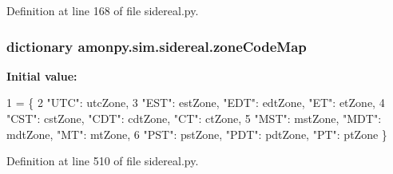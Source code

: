 Definition at line 168 of file sidereal.\-py.

\hypertarget{namespaceamonpy_1_1sim_1_1sidereal_a6cd8e6bf54dcd2fc71cbd9ff87c0189b}{
\subsubsection[{zone\-Code\-Map}]{\setlength{\rightskip}{0pt plus 5cm}dictionary amonpy.\-sim.\-sidereal.\-zone\-Code\-Map}}\label{namespaceamonpy_1_1sim_1_1sidereal_a6cd8e6bf54dcd2fc71cbd9ff87c0189b}
{\bfseries Initial value\-:}
\begin{DoxyCode}
1 = \{
2     \textcolor{stringliteral}{"UTC"}: utcZone,
3     \textcolor{stringliteral}{"EST"}: estZone,    \textcolor{stringliteral}{"EDT"}: edtZone,    \textcolor{stringliteral}{"ET"}:  etZone,
4     \textcolor{stringliteral}{"CST"}: cstZone,    \textcolor{stringliteral}{"CDT"}: cdtZone,    \textcolor{stringliteral}{"CT"}:  ctZone,
5     \textcolor{stringliteral}{"MST"}: mstZone,    \textcolor{stringliteral}{"MDT"}: mdtZone,    \textcolor{stringliteral}{"MT"}:  mtZone,
6     \textcolor{stringliteral}{"PST"}: pstZone,    \textcolor{stringliteral}{"PDT"}: pdtZone,    \textcolor{stringliteral}{"PT"}:  ptZone \}
\end{DoxyCode}


Definition at line 510 of file sidereal.\-py.

